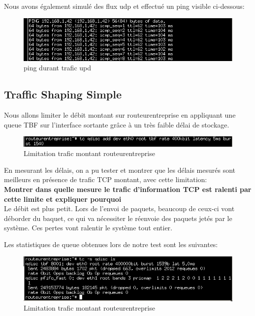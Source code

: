 \documentclass{article}
\begin{document}
Nous avons également simulé des flux udp et effectué un ping visible ci-dessous:\\

\begin{figure}[h]
  \centering
  \includegraphics[width=\linewidth]{./captures/10-udp.png}
  \caption{ping durant trafic upd}
  \label{fig:token-bucket}
\end{figure}
\newpage

\subsection{Traffic Shaping Simple}
Nous allons limiter le débit montant sur routeurentreprise en appliquant une queue TBF sur l'interface sortante grâce à un très faible délai de stockage.
\begin{figure}[h]
  \centering
  \includegraphics[width=\linewidth]{./captures/11-limite.png}
  \caption{Limitation trafic montant routeurentreprise}
  \label{fig:token-bucket}
\end{figure}

En mesurant les délais, on a pu tester et montrer que les délais mesurés sont meilleurs en présence de trafic TCP montant, avec cette limitation:
\\

\textbf{Montrer dans quelle mesure le trafic d'information TCP est ralenti par cette limite et expliquer pourquoi}\\
Le débit est plus petit. Lors de l'envoi de paquets, beaucoup de ceux-ci vont déborder du baquet, ce qui va nécessiter le réenvoie des paquets jetés par le système. Ces pertes vont ralentir le système tout entier.

Les statistiques de queue obtenues lors de notre test sont les suivantes:
\begin{figure}[h]
  \centering
  \includegraphics[width=\linewidth]{./captures/13-stat-queue.png}
  \caption{Limitation trafic montant routeurentreprise}
  \label{fig:token-bucket}
\end{figure}
\end{document}
